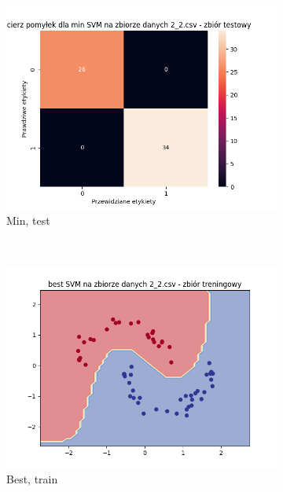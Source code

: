 \documentclass[12pt]{article}
\newcommand*{\subfigwidth}{0.24\textwidth}
\begin{document}
\begin{figure}[H]
\begin{subfigure}[t]{\subfigwidth}
        \includegraphics[width=\linewidth]{img/exp_3/svm/2_2/min/test_matrix.png}
        \caption{Min, test}
    \end{subfigure}
    \\
    \begin{subfigure}[t]{\subfigwidth}
        \includegraphics[width=\linewidth]{img/exp_3/svm/2_2/best/train_boundary.png}
        \caption{Best, train}
    \end{subfigure}
    \hfill
    \begin{subfigure}[t]{\subfigwidth}

\end{subfigure}
\end{figure}
\end{document}
